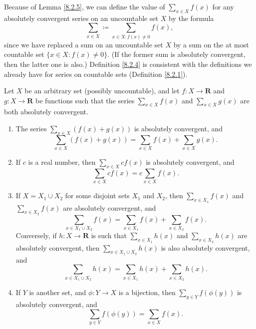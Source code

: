 \begin{note}
    Because of Lemma \ref{8.2.5}, we can define the value of \(\sum_{x \in X} f(x)\) for any absolutely convergent series on an uncountable set \(X\) by the formula
    \[
        \sum_{x \in X} \coloneqq \sum_{x \in X : f(x) \neq 0} f(x),
    \]
    since we have replaced a sum on an uncountable set \(X\) by a sum on the at most countable set \(\{x \in X : f(x) \neq 0\}\).
    (If the former sum is absolutely convergent, then the latter one is also.)
    Definition \ref{8.2.4} is consistent with the definitions we already have for series on countable sets (Definition \ref{8.2.1}).
\end{note}

\begin{proposition}\label{8.2.6}
    Let \(X\) be an arbitrary set (possibly uncountable), and let \(f : X \to \mathbf{R}\) and \(g : X \to \mathbf{R}\) be functions such that the series \(\sum_{x \in X} f(x)\) and \(\sum_{x \in X} g(x)\) are both absolutely convergent.
    \begin{enumerate}
        \item The series \(\sum_{x \in X} (f(x) + g(x))\) is absolutely convergent, and
              \[
                  \sum_{x \in X} (f(x) + g(x)) = \sum_{x \in X} f(x) + \sum_{x \in X} g(x).
              \]
        \item If \(c\) is a real number, then \(\sum_{x \in X} cf(x)\) is absolutely convergent, and
              \[
                  \sum_{x \in X} cf(x) = c \sum_{x \in X} f(x).
              \]
        \item If \(X = X_1 \cup X_2\) for some disjoint sets \(X_1\) and \(X_2\), then \(\sum_{x \in X_1} f(x)\) and \\
              \(\sum_{x \in X_2} f(x)\) are absolutely convergent, and
              \[
                  \sum_{x \in X_1 \cup X_2} f(x) = \sum_{x \in X_1} f(x) + \sum_{x \in X_2} f(x).
              \]
              Conversely, if \(h : X \to \mathbf{R}\) is such that \(\sum_{x \in X_1} h(x)\) and \(\sum_{x \in X_2} h(x)\) are absolutely convergent, then \(\sum_{x \in X_1 \cup X_2} h(x)\) is also absolutely convergent, and
              \[
                  \sum_{x \in X_1 \cup X_2} h(x) = \sum_{x \in X_1} h(x) + \sum_{x \in X_2} h(x).
              \]
        \item If \(Y\) is another set, and \(\phi : Y \to X\) is a bijection, then \(\sum_{y \in Y} f(\phi(y))\) is absolutely convergent, and
              \[
                  \sum_{y \in Y} f(\phi(y)) = \sum_{x \in X} f(x).
              \]
    \end{enumerate}
\end{proposition}

